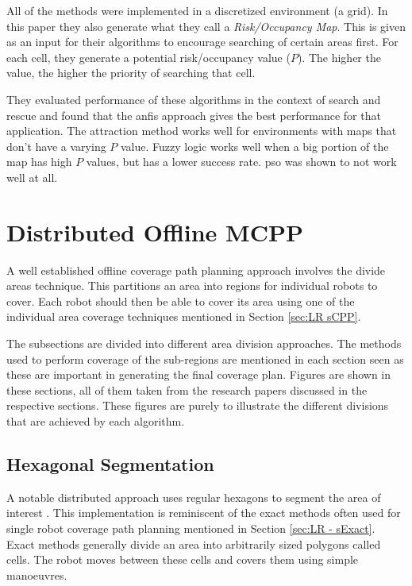 All of the methods were implemented in a discretized environment (a grid). In this paper they also generate what they call a \emph{Risk/Occupancy Map}. This is given as an input for their algorithms to encourage searching of certain areas first. For each cell, they generate a potential risk/occupancy value ($P$). The higher the value, the higher the priority of searching that cell.

They evaluated performance of these algorithms in the context of search and rescue and found that the \ac{anfis} approach gives the best performance for that application. The attraction method works well for environments with maps that don't have a varying $P$ value. Fuzzy logic works well when a big portion of the map has high $P$ values, but has a lower success rate. \ac{pso} was shown to not work well at all.


\section{Distributed Offline MCPP}
\label{sec:LR Ditributed MCPP}
A well established offline coverage path planning approach involves the divide areas technique. This partitions an area into regions for individual robots to cover. Each robot should then be able to cover its area using one of the individual area coverage techniques mentioned in Section \ref{sec:LR sCPP}. 

The subsections are divided into different area division approaches. The methods used to perform coverage of the sub-regions are mentioned in each section seen as these are important in generating the final coverage plan. Figures are shown in these sections, all of them taken from the research papers discussed in the respective sections. These figures are purely to illustrate the different divisions that are achieved by each algorithm.
\subsection{Hexagonal Segmentation}
\label{sec:LR-Hex}
A notable distributed approach uses regular hexagons to segment the area of interest \cite{Azpurua2018}. This implementation is reminiscent of the exact methods often used for single robot coverage path planning mentioned in Section \ref{sec:LR - sExact}. Exact methods generally divide an area into arbitrarily sized polygons called cells. The robot moves between these cells and covers them using simple manoeuvres. 

